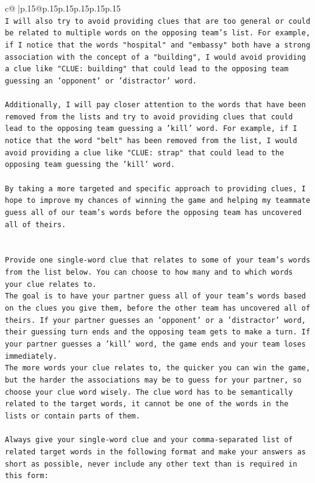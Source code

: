 \documentclass{article}
\begin{document}
{\begin{supertabular}{c@{$\;$}|p{.15\linewidth}@{}p{.15\linewidth}p{.15\linewidth}p{.15\linewidth}p{.15\linewidth}p{.15\linewidth}}
{{{\\ 
\texttt{I will also try to avoid providing clues that are too general or could be related to multiple words on the opposing team's list. For example, if I notice that the words "hospital" and "embassy" both have a strong association with the concept of a "building", I would avoid providing a clue like "CLUE: building" that could lead to the opposing team guessing an 'opponent' or 'distractor' word.} \\
\\ 
\texttt{Additionally, I will pay closer attention to the words that have been removed from the lists and try to avoid providing clues that could lead to the opposing team guessing a 'kill' word. For example, if I notice that the word "belt" has been removed from the list, I would avoid providing a clue like "CLUE: strap" that could lead to the opposing team guessing the 'kill' word.} \\
\\ 
\texttt{By taking a more targeted and specific approach to providing clues, I hope to improve my chances of winning the game and helping my teammate guess all of our team's words before the opposing team has uncovered all of theirs.} \\
\\ 
\\ 
\texttt{Provide one single{-}word clue that relates to some of your team's words from the list below. You can choose to how many and to which words your clue relates to.} \\
\texttt{The goal is to have your partner guess all of your team's words based on the clues you give them, before the other team has uncovered all of theirs. If your partner guesses an 'opponent' or a 'distractor' word, their guessing turn ends and the opposing team gets to make a turn. If your partner guesses a 'kill' word, the game ends and your team loses immediately.} \\
\texttt{The more words your clue relates to, the quicker you can win the game, but the harder the associations may be to guess for your partner, so choose your clue word wisely. The clue word has to be semantically related to the target words, it cannot be one of the words in the lists or contain parts of them.} \\
\\ 
\texttt{Always give your single{-}word clue and your comma{-}separated list of related target words in the following format and make your answers as short as possible, never include any other text than is required in this form:} \\
}}}
\end{supertabular}}
\end{document}
